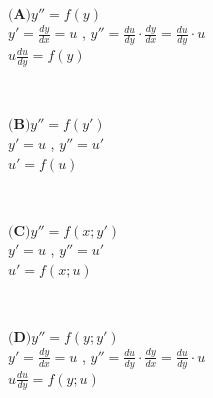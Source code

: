 \documentclass[a4paper]{article}
\begin{document}
	\begin{fmerke}
			\begin{description}
				\item[$$] \begin{multicols}{3}
					$\textbf{(A)} y''=f(y)$ \\
					\columnbreak
					$y'=\frac{dy}{dx}=u$ ,
					$y''=\frac{du}{dy}\cdot\frac{dy}{dx}= \frac{du}{dy}\cdot u$ \\
					\columnbreak \hspace{6mm}
					$u\frac{du}{dy}=f(y)$
					\end{multicols}

					\item[$$] \begin{multicols}{3}
					$\textbf{(B)} y''=f(y')$ \\
					\columnbreak
					$y'=u$ ,
					$y''=u'$ \\
					\columnbreak \hspace{6mm}
					$u'=f(u)$
					\end{multicols}

					\item[$$] \begin{multicols}{3}
					$\textbf{(C)} y''=f(x; y')$ \\
					\columnbreak
					$y'=u$ ,
					$y''=u'$ \\
					\columnbreak \hspace{6mm}
					$u'=f(x; u)$
					\end{multicols}

					\item[$$] \begin{multicols}{3}
					$\textbf{(D)} y''=f(y; y')$ \\
					\columnbreak
					$y'=\frac{dy}{dx}=u$ ,
					$y''=\frac{du}{dy}\cdot\frac{dy}{dx}= \frac{du}{dy}\cdot u$ \\
					\columnbreak \hspace{6mm}
					$u\frac{du}{dy}=f(y;u)$
					\end{multicols}
			\end{description}
		\end{fmerke}
\end{document}
